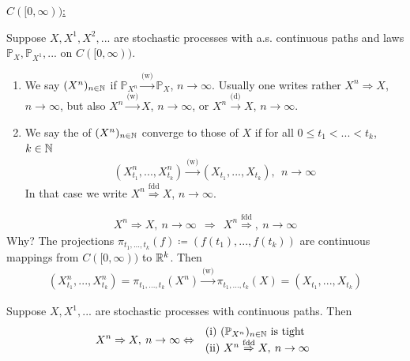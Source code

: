 \underline{$C([0,\infty))$:}
\begin{deff1}
	Suppose $X,X^1,X^2,...$ are stochastic processes with a.s. continuous paths and laws $\mathbb{P}_X,\mathbb{P}_{X^1},...$ on $C([0,\infty))$.
	\begin{enumerate}[label=(\roman*)]
		\item We say $(X^n)_{n\in\mathbb{N}}$ \underline{} if $\mathbb{P}_{X^n} \overset{\text{(w)}}{\longrightarrow} \mathbb{P}_X$, $n\to\infty$. Usually one writes rather $X^n \Rightarrow X$, $n\to \infty$, but also $X^n \overset{\text{(w)}}{\rightarrow} X$, $n\to\infty$, or $X^n \overset{\text{(d)}}{\rightarrow} X$, $n\to\infty$.
		\item We say the \underline{} of $(X^n)_{n\in\mathbb{N}}$ converge to those of $X$ if for all $0 \leq t_1 < ... < t_k$, $k\in\mathbb{N}$
		\begin{align*}
			\left( X_{t_1}^n,...,X_{t_k}^n \right) \overset{\text{(w)}}{\longrightarrow} \left( X_{t_1},...,X_{t_k}\right), \:\: n\to\infty
		\end{align*}
		In that case we write $X^n \overset{\text{fdd}}{\Rightarrow}X$, $n\to\infty$.
	\end{enumerate}
\end{deff1}
\begin{bem1}\label{637_cmt}
	\begin{align*}
		X^n \Rightarrow X,\: n\to\infty \:\: \Rightarrow \:\: X^n \overset{\text{fdd}}{\Rightarrow}, \: n\to\infty
	\end{align*}
	Why? The projections $\pi_{t_1,...,t_k}(f)\coloneqq \left(f(t_1),...,f(t_k)\right)$ are continuous mappings from $C([0,\infty))$ to $\mathbb{R}^k$. Then 
	\begin{align*}
		\left( X_{t_1}^n,...,X_{t_k}^n \right) = \pi_{t_1,...,t_k}(X^n) \overset{\text{(w)}}{\longrightarrow}  \pi_{t_1,...,t_k}(X) = \left(X_{t_1},...,X_{t_k}\right)
	\end{align*}
\end{bem1}
\begin{lsatz}
\begin{theorem}
	Suppose $X,X^1,...$ are stochastic processes with continuous paths. Then
	\begin{align*}
		X^n \Rightarrow X,\: n\to\infty \Leftrightarrow \: \begin{array}{l}
			\text{(i) }(\mathbb{P}_{X^n})_{n\in\mathbb{N}} \text{ is tight} \\
			\text{(ii) } X^n \overset{\text{fdd}}{\Rightarrow}X, \: n\to\infty
		\end{array}
	\end{align*}
\end{theorem}
\end{lsatz}
